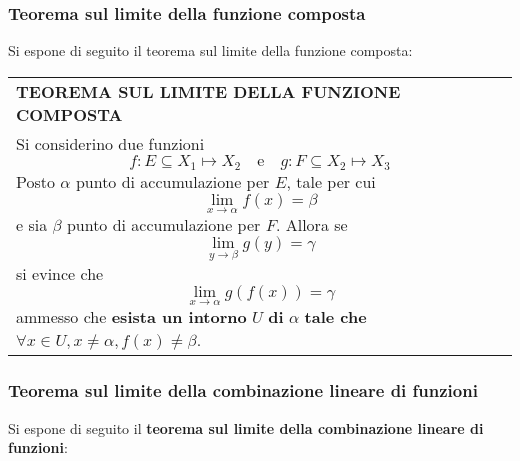 \documentclass[a4paper]{extarticle}
\renewcommand\arraystretch{}
\begin{document}
\vspace{1em}
\noindent
\subsubsection{Teorema sul limite della funzione composta}
Si espone di seguito il teorema sul limite della funzione composta:

\vspace{1em}
\setlength{\tabcolsep}{14pt}
\renewcommand{\arraystretch}{2}
\noindent
\begin{tabularx}{\textwidth}{@{}|P|@{}}
    \hline
    {\textbf{TEOREMA SUL LIMITE DELLA FUNZIONE COMPOSTA}}\\
    \parbox{\linewidth}{Si considerino due funzioni
    \[f : E \subseteq X_1 \longmapsto X_2 \hspace{1em} \text{e} \hspace{1em} g : F \subseteq X_2 \longmapsto X_3\]
    Posto $\alpha$ punto di accumulazione per $E$, tale per cui
    \[\lim_{x \to \alpha} f(x) = \beta\]
    e sia $\beta$ punto di accumulazione per $F$. Allora se
    \[\lim_{y \to \beta} g(y) = \gamma\]
    si evince che
    \[\lim_{x \to \alpha} g(f(x)) = \gamma\]
    ammesso che \textbf{esista un intorno} $U$ \textbf{di} $\alpha$ \textbf{tale che} $\forall x \in U, x \neq \alpha, f(x) \neq \beta$.
    \vspace{3mm}}\\
    \hline
\end{tabularx}

\vspace{1em}
\noindent
\subsubsection{Teorema sul limite della combinazione lineare di funzioni}
Si espone di seguito il \textbf{teorema sul limite della combinazione lineare di funzioni}:
\end{document}
